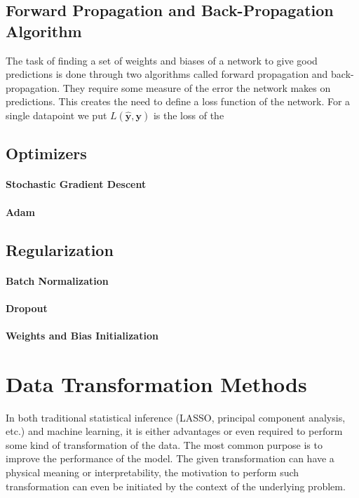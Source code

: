 \documentclass[11pt,oneside,czech,american]{book} %
\theoremstyle{definition} %
\theoremstyle{definition}
\begin{document}
\subsection*{Forward Propagation and Back-Propagation Algorithm}
The task of finding a set of weights and biases of a network to give good predictions is done through two algorithms called forward propagation and back-propagation. They require some measure of the error the network makes on predictions. This creates the need to define a loss function of the network. For a single datapoint we put $L(\bm{\hat{y}}, \bm{y})$ is the loss of the 

\subsection*{Optimizers}

\paragraph*{Stochastic Gradient Descent}

\paragraph*{Adam}

\subsection*{Regularization}

\paragraph*{Batch Normalization}

\paragraph*{Dropout}

\paragraph*{Weights and Bias Initialization}


\section{Data Transformation Methods}
In both traditional statistical inference (LASSO, principal component analysis, etc.) and machine learning, it is either advantages or even required to perform some kind of transformation of the data. The most common purpose is to improve the performance of the model. The given transformation can have a physical meaning or interpretability, the motivation to perform such transformation can even be initiated by the context of the underlying problem.
\end{document}
